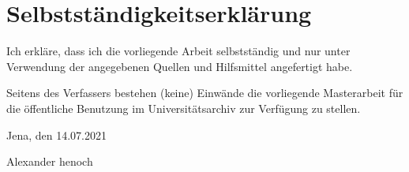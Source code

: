 \chapter*{Selbstständigkeitserklärung}

Ich erkläre, dass ich die vorliegende Arbeit selbstständig und nur unter Verwendung der angegebenen Quellen und Hilfsmittel angefertigt habe.

\vspace{1em}

Seitens des Verfassers bestehen (keine) Einwände die vorliegende Masterarbeit für die öffentliche Benutzung im Universitätsarchiv zur Verfügung zu stellen.

\vspace{6em}

Jena, den 14.07.2021\hspace*{0.35\textwidth}\hrulefill

\phantom{Jena, den 14.07.2021}\hspace*{0.35\textwidth}Alexander henoch
